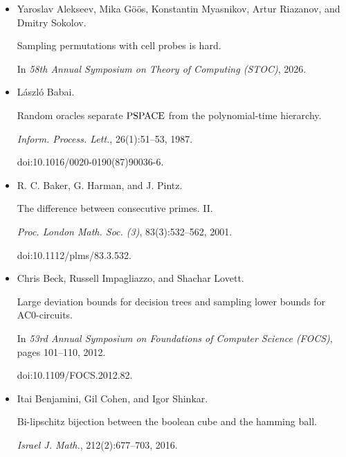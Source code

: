 \documentclass[10pt,a4paper]{article}
\begin{document}
\begin{itemize}


\item[] 
[1]

Yaroslav Alekseev, Mika Göös, Konstantin Myasnikov, Artur Riazanov, and
Dmitry Sokolov.


Sampling permutations with cell probes is hard.


In \emph{58th Annual Symposium on Theory of Computing (STOC)}, 2026.





\item[] 
[2]

László Babai.


Random oracles separate ${\rm PSPACE}$ from the polynomial-time
hierarchy.


\emph{Inform. Process. Lett.}, 26(1):51–53, 1987.


doi:10.1016/0020-0190(87)90036-6.





\item[] 
[3]

R. C. Baker, G. Harman, and J. Pintz.


The difference between consecutive primes. II.


\emph{Proc. London Math. Soc. (3)}, 83(3):532–562, 2001.


doi:10.1112/plms/83.3.532.





\item[] 
[4]

Chris Beck, Russell Impagliazzo, and Shachar Lovett.


Large deviation bounds for decision trees and sampling lower bounds
for AC0-circuits.


In \emph{53rd Annual Symposium on Foundations of Computer Science
(FOCS)}, pages 101–110, 2012.


doi:10.1109/FOCS.2012.82.





\item[] 
[5]

Itai Benjamini, Gil Cohen, and Igor Shinkar.


Bi-lipschitz bijection between the boolean cube and the hamming ball.


\emph{Israel J. Math.}, 212(2):677–703, 2016.



\end{itemize}
\end{document}

